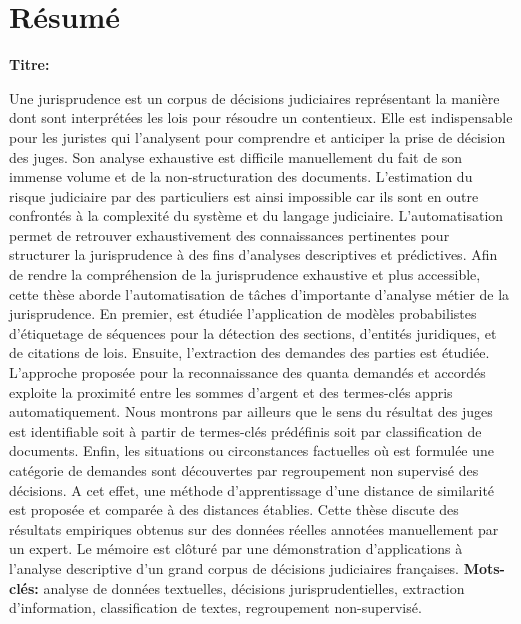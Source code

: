 \chapter*{Résumé}
\textbf{Titre:} \textsc{\titlefr}

Une jurisprudence est un corpus de décisions judiciaires représentant la manière dont sont interprétées les lois pour résoudre un contentieux. Elle est indispensable pour les juristes qui l'analysent pour comprendre et anticiper la prise de décision des juges. Son analyse exhaustive est difficile manuellement du fait de son immense volume et de la non-structuration des documents. L'estimation du risque judiciaire par des particuliers est ainsi impossible car ils sont en outre confrontés à la complexité du système et du langage judiciaire. L'automatisation permet de retrouver exhaustivement des connaissances pertinentes pour structurer la jurisprudence à des fins d'analyses descriptives et prédictives.  
Afin de rendre la compréhension de la jurisprudence exhaustive et plus accessible, cette thèse aborde l'automatisation de tâches d'importante  d'analyse métier de la jurisprudence. En premier, est étudiée l'application de modèles probabilistes d'étiquetage de séquences pour la détection des sections, d'entités juridiques, et de citations de lois. Ensuite, l'extraction des demandes des parties est étudiée.  L'approche proposée pour la reconnaissance des quanta demandés et accordés exploite la proximité entre les sommes d'argent et des termes-clés appris automatiquement. Nous montrons par ailleurs que le sens du résultat des juges est identifiable soit à partir de termes-clés prédéfinis soit par classification de documents. Enfin, les situations ou circonstances factuelles où est formulée une catégorie de demandes sont découvertes par regroupement non supervisé des décisions. A cet effet, une méthode d'apprentissage d'une distance de similarité est proposée et comparée à des distances établies.
Cette thèse discute des résultats empiriques obtenus sur des données réelles annotées manuellement par un expert. Le mémoire est clôturé par une démonstration d'applications à l'analyse descriptive d'un grand corpus de décisions judiciaires françaises.
\newline
\textbf{Mots-clés:} analyse de données textuelles, décisions jurisprudentielles, extraction d'information, classification de textes, regroupement non-supervisé.

